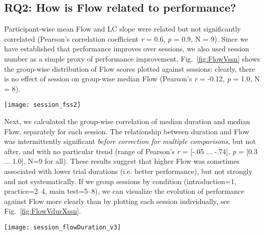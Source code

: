 \subsection*{RQ2: How is Flow related to performance?}

Participant-wise mean Flow and LC slope were related but not significantly correlated (Pearson's correlation coefficient {\it r} = 0.6, {\it p} = 0.9, N = 9). %
Since we have established that performance improves over sessions, we also used session number as a simple proxy of performance improvement. Fig.~\ref{fig:FlowVssn} shows the group-wise distribution of Flow scores plotted against sessions: clearly, there is no effect of session on group-wise median Flow (Pearson's {\it r} = -0.12, {\it p} = 1.0, N = 8).%

\begin{figure*}[!b]
	\centering
	\texttt{[image: session\_fss2]}
	\caption{Violin plot representing participants' self-reported Flow in sessions 1-8 (per-session Flow = mean of five trials. The self-report items are given in Supplementary information, the scale was 1-7).}
	\label{fig:FlowVssn}
\end{figure*}

Next, we calculated the group-wise correlation of median duration and median Flow, separately for each session. The relationship between duration and Flow was intermittently significant {\it before correction for multiple comparisons}, but not after, and with no particular trend (range of Pearson's {\it r} = [-.05 $\dots$ -.74], {\it p} = [0.3 $\dots$ 1.0], N=9 for all). These results suggest that higher Flow was sometimes associated with lower trial durations (i.e. better performance), but not strongly and not systematically. If we group sessions by condition (introduction=1, practice=2--4, main test=5--8), we can visualize the evolution of performance against Flow more clearly than by plotting each session individually, see Fig.~\ref{fig:FlowVdurXssn}.%

\begin{figure*}[!t]
  \centering
  \texttt{[image: session\_flowDuration\_v3]}
  \caption{Duration and Flow over sessions grouped: 1 (Introduction+physiological measurements), 2-4 (training), 5-8 (physiological measurements), N = 72.}
  \label{fig:FlowVdurXssn}
\end{figure*}

